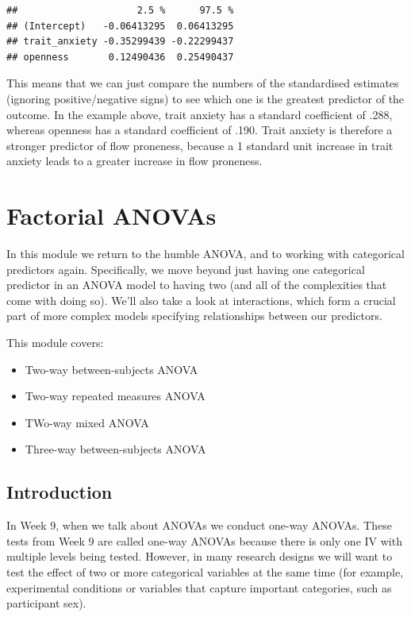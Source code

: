 \documentclass[
]{book}
\providecommand{\tightlist}{%
  \setlength{\itemsep}{0pt}\setlength{\parskip}{0pt}}
\begin{document}
\begin{verbatim}
##                     2.5 %      97.5 %
## (Intercept)   -0.06413295  0.06413295
## trait_anxiety -0.35299439 -0.22299437
## openness       0.12490436  0.25490437
\end{verbatim}

This means that we can just compare the numbers of the standardised estimates (ignoring positive/negative signs) to see which one is the greatest predictor of the outcome. In the example above, trait anxiety has a standard coefficient of .288, whereas openness has a standard coefficient of .190. Trait anxiety is therefore a stronger predictor of flow proneness, because a 1 standard unit increase in trait anxiety leads to a greater increase in flow proneness.

\hypertarget{factorial-anovas}{%
\chapter{Factorial ANOVAs}\label{factorial-anovas}}

In this module we return to the humble ANOVA, and to working with categorical predictors again. Specifically, we move beyond just having one categorical predictor in an ANOVA model to having two (and all of the complexities that come with doing so). We'll also take a look at interactions, which form a crucial part of more complex models specifying relationships between our predictors.

This module covers:

\begin{itemize}
\tightlist
\item
  Two-way between-subjects ANOVA
\item
  Two-way repeated measures ANOVA
\item
  TWo-way mixed ANOVA
\item
  Three-way between-subjects ANOVA
\end{itemize}

\hypertarget{introduction}{%
\section{Introduction}\label{introduction}}

In Week 9, when we talk about ANOVAs we conduct one-way ANOVAs. These tests from Week 9 are called one-way ANOVAs because there is only one IV with multiple levels being tested. However, in many research designs we will want to test the effect of two or more categorical variables at the same time (for example, experimental conditions or variables that capture important categories, such as participant sex).
\end{document}

